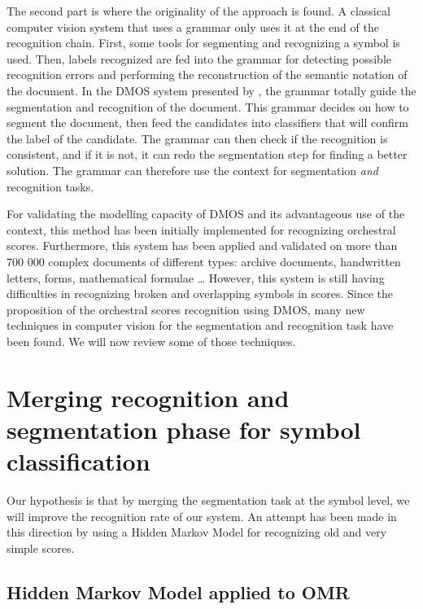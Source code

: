\documentclass[11pt]{sdm}
\begin{document}
The second part is where the originality of the approach is found.
A classical computer vision system that uses a grammar only uses it at the end of the recognition chain.
First, some tools for segmenting and recognizing a symbol is used.
Then, labels recognized are fed into the grammar for detecting possible recognition errors and performing the reconstruction of the semantic notation of the document.
In the DMOS system presented by \cite{couasnon_dmos_2001}, the grammar totally guide the segmentation and recognition of the document.
This grammar decides on how to segment the document, then feed the candidates into classifiers that will confirm the label of the candidate.
The grammar can then check if the recognition is consistent, and if it is not, it can redo the segmentation step for finding a better solution.
The grammar can therefore use the context for segmentation \textit{and} recognition tasks.

For validating the modelling capacity of DMOS and its advantageous use of the context, this method has been initially implemented for recognizing orchestral scores.
Furthermore, this system has been applied and validated on more than 700 000 complex documents of different types: archive documents, handwritten letters, forms, mathematical formulae \ldots
However, this system is still having difficulties in recognizing broken and overlapping symbols in scores.
Since the proposition of the orchestral scores recognition using DMOS, many new techniques in computer vision for the segmentation and recognition task have been found.
We will now review some of those techniques.

\section{Merging recognition and segmentation phase for symbol classification} \label{sec:merge}

Our hypothesis is that by merging the segmentation task at the symbol level, we will improve the recognition rate of our system.
An attempt has been made in this direction by using a Hidden Markov Model for recognizing old and very simple scores.

\subsection{Hidden Markov Model applied to OMR} \label{ssec:HMM}
\end{document}
